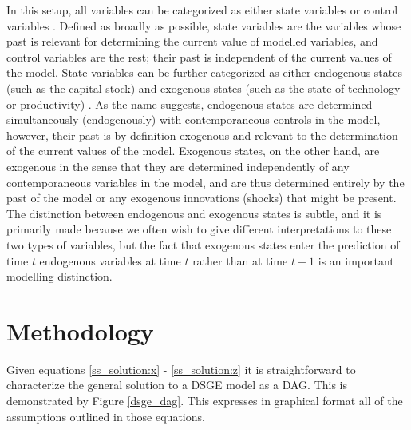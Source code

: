 \documentclass{article}
\begin{document}
In this setup, all variables can be categorized as either state variables or control variables \parencite{fernandez2016solution}. Defined as broadly as possible, state variables are the variables whose past is relevant for determining the current value of modelled variables, and control variables are the rest; their past is independent of the current values of the model. State variables can be further categorized as either endogenous states (such as the capital stock) and exogenous states (such as the state of technology or productivity) \parencite{ravenna2007vector}. As the name suggests, endogenous states are determined simultaneously (endogenously) with contemporaneous controls in the model, however, their past is by definition exogenous and relevant to the determination of the current values of the model. Exogenous states, on the other hand, are exogenous in the sense that they are determined independently of any contemporaneous variables in the model, and are thus determined entirely by the past of the model or any exogenous innovations (shocks) that might be present. The distinction between endogenous and exogenous states is subtle, and it is primarily made because we often wish to give different interpretations to these two types of variables, but the fact that exogenous states enter the prediction of time $t$ endogenous variables at time $t$ rather than at time $t-1$ is an important modelling distinction.

\section{Methodology}

Given equations \ref{ss_solution:x} - \ref{ss_solution:z} it is straightforward to characterize the general solution to a DSGE model as a DAG. This is demonstrated by Figure \ref{dsge_dag}. This expresses in graphical format all of the assumptions outlined in those equations. 
\end{document}
